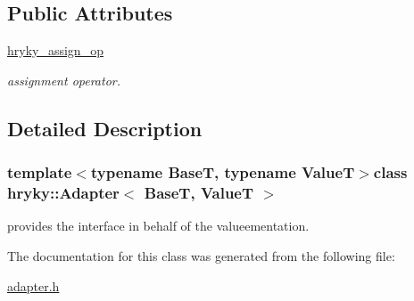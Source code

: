 \subsection*{Public Attributes}
\begin{DoxyCompactItemize}
\item 
\hypertarget{classhryky_1_1_adapter_a764c5fe566545047f3acaf18792e5102}{\hyperlink{classhryky_1_1_adapter_a764c5fe566545047f3acaf18792e5102}{hryky\-\_\-assign\-\_\-op}}\label{classhryky_1_1_adapter_a764c5fe566545047f3acaf18792e5102}

\begin{DoxyCompactList}\small\item\em assignment operator. \end{DoxyCompactList}\end{DoxyCompactItemize}


\subsection{Detailed Description}
\subsubsection*{template$<$typename Base\-T, typename Value\-T$>$class hryky\-::\-Adapter$<$ Base\-T, Value\-T $>$}

provides the interface in behalf of the valueementation. 

The documentation for this class was generated from the following file\-:\begin{DoxyCompactItemize}
\item 
\hyperlink{adapter_8h}{adapter.\-h}\end{DoxyCompactItemize}

